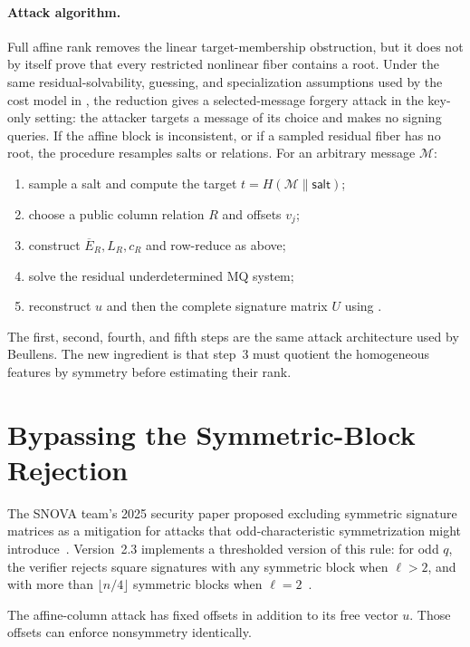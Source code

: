 \documentclass[11pt]{article}
\newcommand{\SNOVA}{\textsf{SNOVA}}
\begin{document}
\paragraph{Attack algorithm.}
Full affine rank removes the linear target-membership obstruction, but it does not by itself prove that every restricted nonlinear fiber contains a root.  Under the same residual-solvability, guessing, and specialization assumptions used by the cost model in , the reduction gives a selected-message forgery attack in the key-only setting: the attacker targets a message of its choice and makes no signing queries.  If the affine block is inconsistent, or if a sampled residual fiber has no root, the procedure resamples salts or relations.  For an arbitrary message $\mathcal M$:
\begin{enumerate}
\item sample a salt and compute the target $t=H(\mathcal M\|\textsf{salt})$;
\item choose a public column relation $R$ and offsets $v_j$;
\item construct $\overline E_R,L_R,c_R$ and row-reduce as above;
\item solve the residual underdetermined MQ system;
\item reconstruct $u$ and then the complete signature matrix $U$ using .
\end{enumerate}
The first, second, fourth, and fifth steps are the same attack architecture used by Beullens.  The new ingredient is that step~3 must quotient the homogeneous features by symmetry before estimating their rank.

\section{Bypassing the Symmetric-Block Rejection}\label{sec:rejection}

The \SNOVA{} team's 2025 security paper proposed excluding symmetric signature matrices as a mitigation for attacks that odd-characteristic symmetrization might introduce~\cite{WangEtAl2025Round2Security}.  Version~2.3 implements a thresholded version of this rule: for odd $q$, the verifier rejects square signatures with any symmetric block when $\ell>2$, and with more than $\lfloor n/4\rfloor$ symmetric blocks when $\ell=2$~\cite{SNOVA23}.

The affine-column attack has fixed offsets in addition to its free vector $u$.  Those offsets can enforce nonsymmetry identically.
\end{document}
